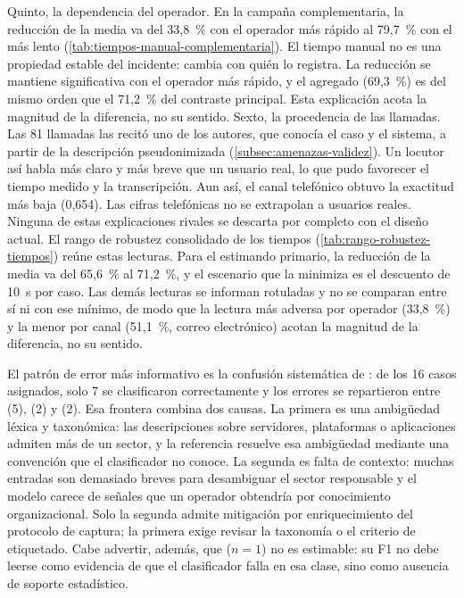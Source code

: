 Quinto, la dependencia del operador. En la campaña complementaria, la reducción de la media va del 33,8~\% con el operador más rápido al 79,7~\% con el más lento (\autoref{tab:tiempos-manual-complementaria}). El tiempo manual no es una propiedad estable del incidente: cambia con quién lo registra. La reducción se mantiene significativa con el operador más rápido, y el agregado (69,3~\%) es del mismo orden que el 71,2~\% del contraste principal. Esta explicación acota la magnitud de la diferencia, no su sentido. Sexto, la procedencia de las llamadas. Las 81 llamadas las recitó uno de los autores, que conocía el caso y el sistema, a partir de la descripción pseudonimizada (\autoref{subsec:amenazas-validez}). Un locutor así habla más claro y más breve que un usuario real, lo que pudo favorecer el tiempo medido y la transcripción. Aun así, el canal telefónico obtuvo la exactitud más baja (0,654). Las cifras telefónicas no se extrapolan a usuarios reales. Ninguna de estas explicaciones rivales se descarta por completo con el diseño actual. El rango de robustez consolidado de los tiempos (\autoref{tab:rango-robustez-tiempos}) reúne estas lecturas. Para el estimando primario, la reducción de la media va del 65,6~\% al 71,2~\%, y el escenario que la minimiza es el descuento de 10~s por caso. Las demás lecturas se informan rotuladas y no se comparan entre sí ni con ese mínimo, de modo que la lectura más adversa por operador (33,8~\%) y la menor por canal (51,1~\%, correo electrónico) acotan la magnitud de la diferencia, no su sentido.

El patrón de error más informativo es la confusión sistemática de : de los 16 casos asignados, solo 7 se clasificaron correctamente y los errores se repartieron entre  (5),  (2) y  (2). Esa frontera combina dos causas. La primera es una ambigüedad léxica y taxonómica: las descripciones sobre servidores, plataformas o aplicaciones admiten más de un sector, y la referencia resuelve esa ambigüedad mediante una convención que el clasificador no conoce. La segunda es falta de contexto: muchas entradas son demasiado breves para desambiguar el sector responsable y el modelo carece de señales que un operador obtendría por conocimiento organizacional. Solo la segunda admite mitigación por enriquecimiento del protocolo de captura; la primera exige revisar la taxonomía o el criterio de etiquetado. Cabe advertir, además, que  (\(n = 1\)) no es estimable: su F1 no debe leerse como evidencia de que el clasificador falla en esa clase, sino como ausencia de soporte estadístico.

